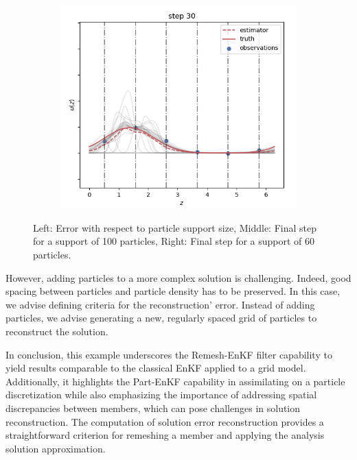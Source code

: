 \begin{figure}
\begin{subfigure}{0.29\textwidth}
		\includegraphics[width=\textwidth]{images/app1d/error_support/not_ok.png}
		\label{error_support3}
	\end{subfigure}
	\caption{Left: Error with respect to particle support size, Middle: Final step for a support of 100 particles, Right: Final step for a support of 60 particles.}
	\label{error_support}
\end{figure}
However, adding particles to a more complex solution is challenging. Indeed, good spacing between particles and particle density has to be preserved. In this case, we advise defining criteria for the reconstruction' error. Instead of adding particles, we advise generating a new, regularly spaced grid of particles to reconstruct the solution.

In conclusion, this example underscores the Remesh-EnKF filter capability to yield results comparable to the classical EnKF applied to a grid model. Additionally, it highlights the Part-EnKF capability in assimilating on a particle discretization while also emphasizing the importance of addressing spatial discrepancies between members, which can pose challenges in solution reconstruction. The computation of solution error reconstruction provides a straightforward criterion for remeshing a member and applying the analysis solution approximation.


\newpage